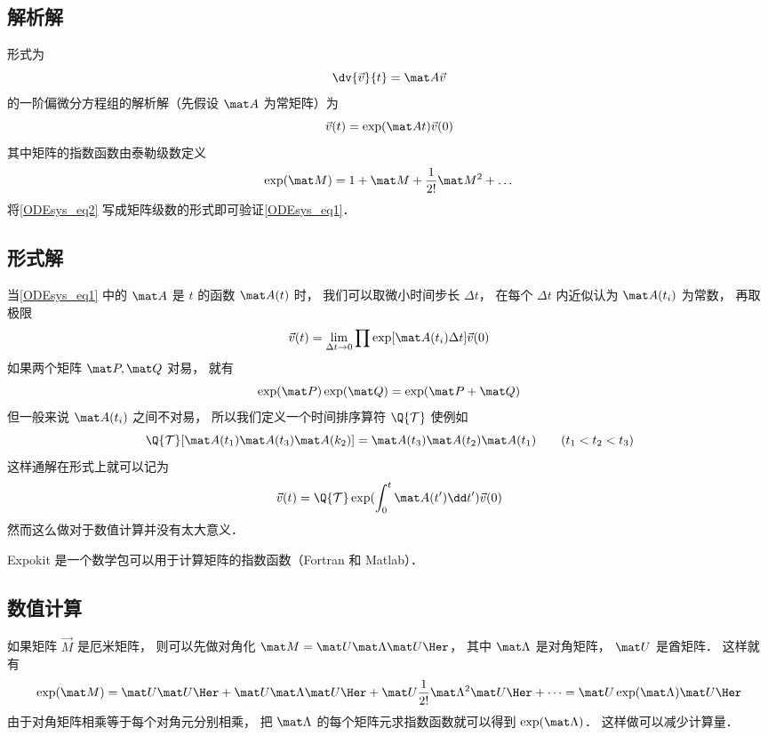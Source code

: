 
\subsection{解析解}
形式为
\begin{equation}\label{ODEsys_eq1}
\dv{\vec v}{t} = \mat A \vec v
\end{equation}
的一阶偏微分方程组的解析解（先假设 $\mat A$ 为常矩阵）为
\begin{equation}\label{ODEsys_eq2}
\vec v(t) = \exp(\mat At) \vec v(0)
\end{equation}
其中矩阵的指数函数由泰勒级数定义
\begin{equation}
\exp(\mat M) = 1 + \mat M + \frac1{2!} \mat M^2 + \dots
\end{equation}
将\autoref{ODEsys_eq2} 写成矩阵级数的形式即可验证\autoref{ODEsys_eq1}．

\subsection{形式解}
当\autoref{ODEsys_eq1} 中的 $\mat A$ 是 $t$ 的函数 $\mat A(t)$ 时， 我们可以取微小时间步长 $\Delta t$， 在每个 $\Delta t$ 内近似认为 $\mat A(t_i)$ 为常数， 再取极限
\begin{equation}
\vec v(t) = \lim_{\Delta t \to 0} \prod \exp[\mat A(t_i)\Delta t] \vec v(0)
\end{equation}
如果两个矩阵 $\mat P, \mat Q$ 对易， 就有
\begin{equation}
\exp(\mat P)\exp(\mat Q) = \exp(\mat P + \mat Q)
\end{equation}
但一般来说 $\mat A(t_i)$ 之间不对易， 所以我们定义一个时间排序算符 $\Q{\mathcal T}$ 使例如
\begin{equation}
\Q {\mathcal T} [\mat A(t_1) \mat A(t_3) \mat A(k_2)] = \mat A(t_3) \mat A(t_2) \mat A(t_1) \qquad ( t_1 < t_2 < t_3 )
\end{equation}
这样通解在形式上就可以记为
\begin{equation}
\vec v(t) = \Q {\mathcal T} \exp(\int_0^ t \mat A(t')\dd t') \vec v(0)
\end{equation}
然而这么做对于数值计算并没有太大意义．

Expokit 是一个数学包可以用于计算矩阵的指数函数（Fortran 和 Matlab）．

\subsection{数值计算}
如果矩阵 $\vec M$ 是厄米矩阵， 则可以先做对角化 $\mat M = \mat U \mat \Lambda \mat U\Her$， 其中 $\mat \Lambda$ 是对角矩阵， $\mat U$ 是酋矩阵． 这样就有
\begin{equation}
\exp(\mat M) = \mat U \mat U\Her + \mat U\mat \Lambda\mat U\Her + \mat U\frac1{2!} \mat \Lambda^2 \mat U\Her + \dots = \mat U \exp(\mat \Lambda) \mat U\Her
\end{equation}
由于对角矩阵相乘等于每个对角元分别相乘， 把 $\mat\Lambda$ 的每个矩阵元求指数函数就可以得到 $\exp(\mat \Lambda)$． 这样做可以减少计算量．


